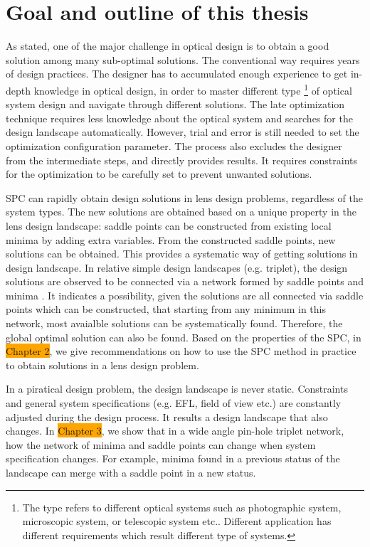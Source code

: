 \section{Goal and outline of this thesis}
As stated, one of the major challenge in optical design is to obtain a good solution among many sub-optimal solutions. The conventional way requires years of design practices. The designer has to accumulated enough experience to get in-depth knowledge in optical design, in order to master different type \footnote{The type refers to different optical systems such as photographic system, microscopic system, or telescopic system etc.. Different application has different requirements which result different type of systems.} of optical system design and navigate through different solutions. The late optimization technique requires less knowledge about the optical system and searches for the design landscape automatically. However, trial and error is still needed to set the optimization configuration parameter. The process also excludes the designer from the intermediate steps, and directly provides results. It requires constraints for the optimization to be carefully set to prevent unwanted solutions.   

SPC can rapidly obtain design solutions in lens design problems, regardless of the system types. The new solutions are obtained based on a unique property in the lens design landscape: saddle points can be constructed from existing local minima by adding extra variables. From the constructed saddle points, new solutions can be obtained. This provides a systematic way of getting solutions in design landscape. In relative simple design landscapes (e.g. triplet), the design solutions are observed to be connected via a network formed by saddle points and minima \cite{PascalTriplet2009}. It indicates a possibility, given the solutions are all connected via saddle points which can be constructed, that starting from any minimum in this network, most avaialble solutions can be systematically found. Therefore, the global optimal solution can also be found. Based on the properties of the SPC, in \colorbox{orange}{Chapter 2}, we give recommendations on how to use the SPC method in practice to obtain solutions in a lens design problem.

In a piratical design problem, the design landscape is never static. Constraints and general system specifications (e.g. EFL, field of view etc.) are constantly adjusted during the design process. It results a design landscape that also changes. In \colorbox{orange}{Chapter 3}, we show that in a wide angle pin-hole triplet network, how the network of minima and saddle points can change when system specification changes. For example, minima found in a previous status of the landscape can merge with a saddle point in a new status. 

